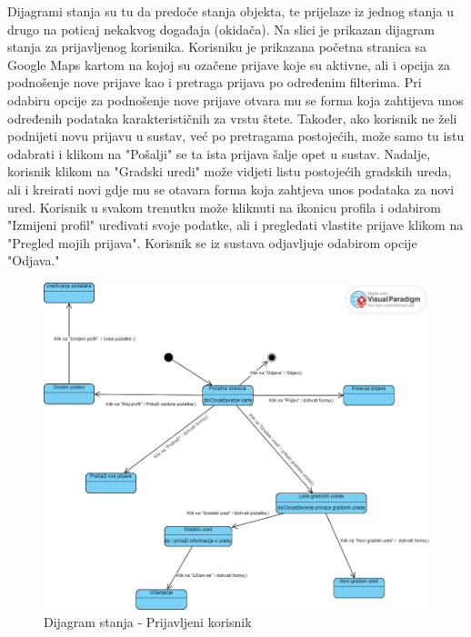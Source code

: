 			
			Dijagrami stanja su tu da predoče stanja objekta, te prijelaze iz jednog stanja u drugo na poticaj nekakvog događaja (okidača). Na slici je prikazan dijagram stanja za prijavljenog korisnika. Korisniku je prikazana početna stranica sa Google Maps kartom na kojoj su ozačene prijave koje su aktivne, ali i opcija za podnošenje nove prijave kao i pretraga prijava po određenim filterima. Pri odabiru opcije za podnošenje nove prijave otvara mu se forma koja zahtijeva unos određenih podataka karakterističnih za vrstu  štete. Također, ako korisnik ne želi podnijeti novu prijavu u sustav, već po pretragama postojećih, može samo tu istu odabrati i klikom na "Pošalji" se ta ista prijava šalje opet u sustav. Nadalje, korisnik klikom na "Gradski uredi" može vidjeti listu postojećih gradskih ureda, ali i kreirati novi gdje mu se otavara forma koja zahtjeva unos podataka za novi ured. Korisnik u svakom trenutku može kliknuti na ikonicu profila i odabirom "Izmijeni profil" uređivati svoje podatke, ali i pregledati vlastite prijave klikom na "Pregled mojih prijava". Korisnik se iz sustava odjavljuje odabirom opcije "Odjava."
			
			
			\begin{figure}[H]
			\includegraphics[scale=0.4]{slike/DijagramStanja.PNG} %
			\centering
			\caption{Dijagram stanja - Prijavljeni korisnik}
			\label{fig:bazapod}
		\end{figure}
			
			\eject 
		
